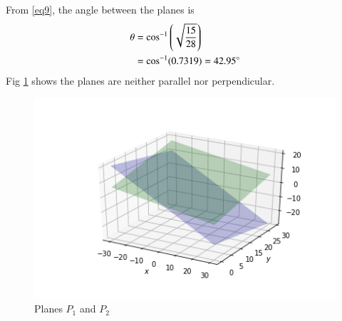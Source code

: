 \documentclass[journal,12pt,twocolumn]{IEEEtran}
\begin{document}
From \ref{eq9}, the angle between the planes is
\begin{align}
 \theta &=\cos^{-1}\left(\sqrt{\frac{15}{28}}\right)
   \\ &=\cos^{-1}(0.7319)=42.95\degree
\end{align}
Fig \ref{fig:1} shows the planes are neither parallel nor perpendicular.
\begin{figure}[!ht]
\centering
    \includegraphics[width= \columnwidth]{assignment4.png}
    \caption{Planes $P_1$ and $P_2$} \label{fig:1}
\end{figure}
\end{document}
